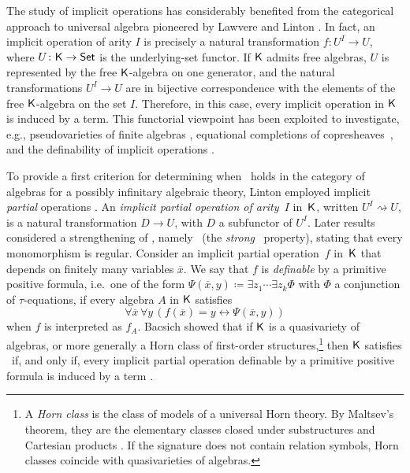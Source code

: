 \documentclass[a4paper,10pt,reqno]{amsart}
\theoremstyle{definition}
\theoremstyle{remark}
\begin{document}
The study of implicit operations has considerably benefited from the categorical approach to universal algebra pioneered by Lawvere and Linton \cite{Lawvere1963,Linton1966}. In fact, an implicit operation of arity $I$ is precisely a natural transformation $f\colon U^{I}\to U$, where $U\colon {\sf K}\to{\sf Set}$ is the underlying-set functor. 
If ${\sf K}$ admits free algebras, $U$ is represented by the free ${\sf K}$-algebra on one generator, and the natural transformations $U^{I}\to U$ are in bijective correspondence with the elements of the free ${\sf K}$-algebra on the set $I$. Therefore, in this case, every implicit operation in ${\sf K}$ is induced by a term.
This functorial viewpoint has been exploited to investigate, e.g., pseudovarieties of finite algebras \cite{RP1981,Reiterman1982}, equational completions of copresheaves~\cite{KG1971}, and the definability of implicit operations \cite{Isbell1973,Hodges1980,Isbell1983,Hebert1990}. 


%
To provide a first criterion for determining when \ES~holds in the category of algebras for a possibly infinitary algebraic theory, Linton employed implicit \emph{partial} operations \cite[Proposition~7]{Linton1966}. An \emph{implicit partial operation of arity~$I$} in~${\sf K}$, written $U^I \rightsquigarrow U$, is a natural transformation $D\to U$, with $D$ a subfunctor of $U^{I}$. 
%
Later results considered a strengthening of \ES, namely \SES~(the \emph{strong} \ES~property), stating that every monomorphism is regular. 
Consider an implicit partial operation~$f$ in~${\sf K}$ that depends on finitely many variables $\overline{x}$. We say that $f$ is \emph{definable} by a primitive positive formula, i.e.\ one of the form $\Psi(\overline{x},y)\coloneqq\exists z_{1}\cdots\exists z_{k}\Phi$ with $\Phi$ a conjunction of $\tau$-equations, if every algebra $A$ in ${\sf K}$ satisfies
\[
\forall \overline{x}\, \forall y \, (f(\overline{x})=y \leftrightarrow \Psi(\overline{x},y))
\]
when $f$ is interpreted as $f_{A}$.
%
Bacsich showed that if ${\sf K}$ is a quasivariety of algebras, or more generally a Horn class of first-order structures,\footnote{A \emph{Horn class} is the class of models of a universal Horn theory. By Maltsev's theorem, they are the elementary classes closed under substructures and Cartesian products \cite{Maltsev1966}. If the signature does not contain relation symbols, Horn classes coincide with quasivarieties of algebras.} then ${\sf K}$ satisfies \SES~if, and only if, every implicit partial operation definable by a primitive positive formula is induced by a term \cite[Theorem~4]{Bacsich74}. 
%
\end{document}
